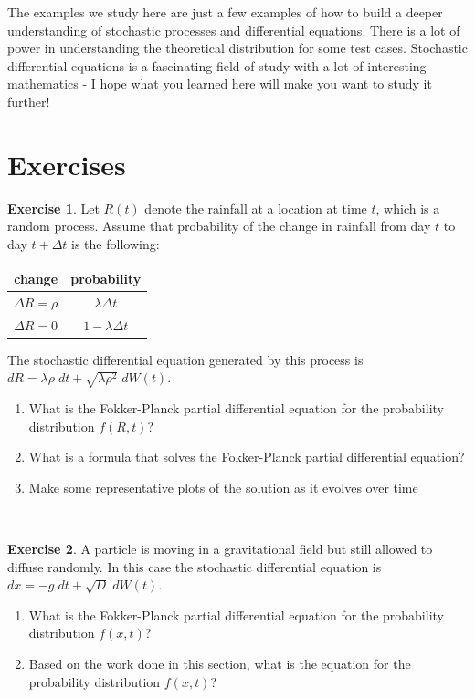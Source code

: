 \documentclass[
]{book}
\theoremstyle{definition}
\theoremstyle{definition}
\theoremstyle{definition}
\newtheorem{exercise}{Exercise}[chapter]
\theoremstyle{remark}
\begin{document}
The examples we study here are just a few examples of how to build a deeper understanding of stochastic processes and differential equations. There is a lot of power in understanding the theoretical distribution for some test cases. Stochastic differential equations is a fascinating field of study with a lot of interesting mathematics - I hope what you learned here will make you want to study it further!

\newpage

\hypertarget{exercises-13}{%
\section{Exercises}\label{exercises-13}}

\begin{exercise}
\protect\hypertarget{exr:unnamed-chunk-360}{}{\label{exr:unnamed-chunk-360} }Let \(R(t)\) denote the rainfall at a location at time \(t\), which is a random process. Assume that probability of the change in rainfall from day \(t\) to day \(t+\Delta t\) is the following:

\begin{center}

\begin{tabular}
{ c c}
change & probability \\ \hline \hline
$\Delta R = \rho$ & $\lambda \Delta t$ \\
$\Delta R = 0$ & $1- \lambda \Delta t$ \\ \hline
\end {tabular}

\end{center}

The stochastic differential equation generated by this process is \(dR = \lambda \rho \; dt + \sqrt{\lambda \rho^{2}} \; dW(t)\).

\begin{enumerate}[label=\alph*.]
\item What is the Fokker-Planck partial differential equation for the probability distribution $f(R,t)$?
\item What is a formula that solves the Fokker-Planck partial differential equation?
\item Make some representative plots of the solution as it evolves over time
\end{enumerate}
\end{exercise}

~
\begin{exercise}
\protect\hypertarget{exr:unnamed-chunk-361}{}{\label{exr:unnamed-chunk-361} }A particle is moving in a gravitational field but still allowed to diffuse randomly. In this case the stochastic differential equation is \(dx = -g \; dt + \sqrt{D} \; dW(t)\).

\begin{enumerate}[label=\alph*.]
\item What is the Fokker-Planck partial differential equation for the probability distribution $f(x,t)$?
\item Based on the work done in this section, what is the equation for the probability distribution $f(x,t)$?
\end{enumerate}
\end{exercise}
\end{document}
